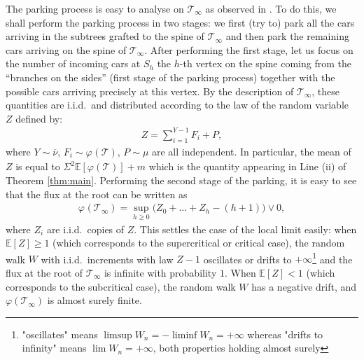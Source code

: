 %




\label{sec:infty}
The parking process is easy to analyse on $ \mathcal{T}_{\infty}$ as observed in \cite{GP19}. {To do this, we shall perform the parking process in two stages: we first (try to) park all the cars arriving in the subtrees grafted to the spine of $ \mathcal{T}_{\infty}$ and then park the remaining cars arriving on the spine of $ \mathcal{T}_{\infty}$. After performing the first stage, let us focus} on the number of incoming cars at $S_{h}$ the $h$-th vertex on the spine coming from the ``branches on the sides'' {(first stage of the parking process)} together with the possible cars arriving precisely at this vertex. By the description of $ \mathcal{T}_{\infty}$, these quantities are i.i.d.~and distributed according to the law of the random variable $Z$ defined by:
 \begin{eqnarray} Z= \sum_{i=1}^{ Y-1} F_{i} + P,   \label{eq:loiZ}\end{eqnarray}
where $ Y \sim \overline{\nu}$, $F_{i} \sim \varphi_{}( \mathcal{T})$, $P \sim \mu$ are all independent. In particular, the mean of $Z$ is equal to $ \Sigma^2 \mathbb{E}[\varphi( \mathcal{T})]+m$ which is the quantity appearing in Line (ii) of Theorem \ref{thm:main}. {Performing the second stage of the parking}, it is easy to see that the flux at the root can be written as 
\begin{eqnarray}
\varphi_{}( \mathcal{T}_{\infty}) = \sup_{h \geq 0} \big(Z_{0}+ \dots+ Z_{h}- (h+1)\big)\vee 0, 
\label{eq:supZ}
\end{eqnarray} 
where $Z_{i}$ are i.i.d.~copies of $Z$. This settles the case of the local limit easily: when $ \mathbb{E}[Z] \geq 1$ (which corresponds to the supercritical or critical case), the random walk $W$ with i.i.d.~increments with law $Z-1$ oscillates or drifts to $+\infty$\footnote{"oscillates" means $\limsup W_n= -\liminf W_n=+\infty$ whereas "drifts to infinity" means $\lim W_n=+\infty$, both properties holding almost surely} and the flux at the root of $ \mathcal{T}_{\infty}$ is infinite with probability $1$. When $ \mathbb{E}[Z]<1$ (which corresponds to the subcritical case), the random walk $W$ has a negative drift, and $ \varphi( \mathcal{T}_\infty)$ is almost surely finite.

